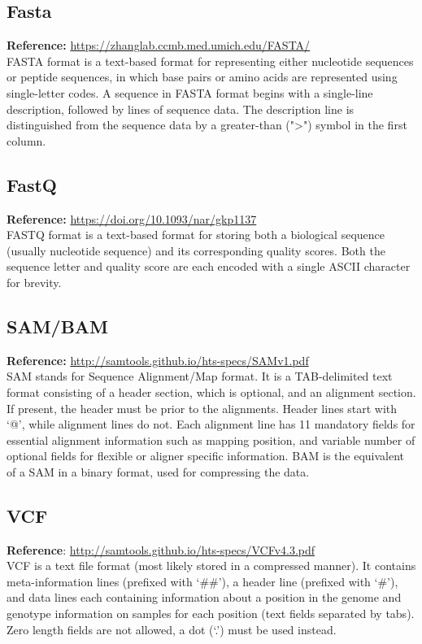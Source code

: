 \documentclass[8pt]{article}
\begin{document}
\subsection*{Fasta}
\textbf{Reference:} \url{https://zhanglab.ccmb.med.umich.edu/FASTA/}\\ 
FASTA format is a text-based format for representing either nucleotide sequences or peptide sequences, in which base pairs or amino acids are represented using single-letter codes. A sequence in FASTA format begins with a single-line description, followed by lines of sequence data. The description line is distinguished from the sequence data by a greater-than (">") symbol in the first column. 
\subsection*{FastQ}
\textbf{Reference:} \url{https://doi.org/10.1093/nar/gkp1137}\\ 
FASTQ format is a text-based format for storing both a biological sequence (usually nucleotide sequence) and its corresponding quality scores. Both the sequence letter and quality score are each encoded with a single ASCII character for brevity. 
\subsection*{SAM/BAM}
\textbf{Reference:} \url{http://samtools.github.io/hts-specs/SAMv1.pdf}\\ 
SAM stands for Sequence Alignment/Map format.  It is a TAB-delimited text format consisting of a header section, which is optional, and an alignment section.  If present, the header must be prior to the alignments. Header lines start with ‘@’, while alignment lines do not.  Each alignment line has 11 mandatory fields for essential alignment information such as mapping position, and variable number of optional fields for flexible or aligner specific information. BAM is the equivalent of a SAM in a binary format, used for compressing the data.
\subsection*{VCF}
\textbf{Reference}: \url{http://samtools.github.io/hts-specs/VCFv4.3.pdf}\\
VCF is a text file format (most likely stored in a compressed manner).  It contains meta-information lines (prefixed with ‘\#\#’), a header line (prefixed with ‘\#’), and data lines each containing information about a position in the genome and genotype information on samples for each position (text fields separated by tabs).  Zero length fields are not allowed, a dot (‘.’) must be used instead.
\end{document}
